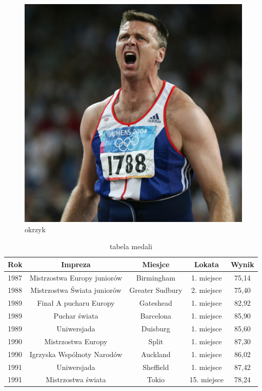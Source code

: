 \documentclass{article}
\begin{document}
\begin{figure}
\centering
\includegraphics[width=0.1\hsize]{3.jpg}
\caption{okrzyk}\label{fig:3}
\end{figure}

\begin{table}



\begin{tabular}{lcccc}
\textbf{Rok}&\textbf{Impreza}&\textbf{Miesjce}&\textbf{Lokata}&\textbf{Wynik}\\
\hline
1987&Mistrzostwa Europy juniorów&Birmingham&1. miejsce&75{,}14\\
1988&Mistrzostwa Świata juniorów&Greater Sudbury&2. miejsce&75{,}40\\
1989&Finał A pucharu Europy&Gateshead&1. miejsce&82{,}92\\
1989&Puchar świata&Barcelona&1. miejsce&85{,}90\\
1989&Uniwersjada&Duisburg&1. miejsce&85{,}60\\
1990&Mistrzostwa Europy&Split&1. miejsce&87{,}30\\
1990&Igrzyska Wspólnoty Narodów&Auckland&1. miejsce&86{,}02\\
1991&Uniwersjada&Sheffield&1. miejsce&87{,}42\\
1991&Mistrzostwa świata&Tokio&15. miejsce&78{,}24\\
\hline


\end{tabular}
\caption{tabela medali}
\label{fig:tabela}
\end{table}
\end{document}
